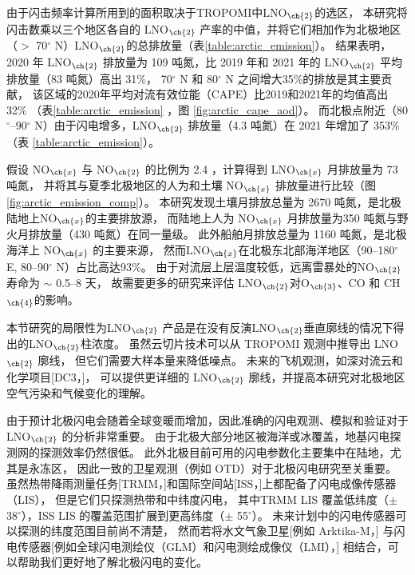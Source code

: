 由于闪击频率计算所用到的面积取决于TROPOMI中LNO$_{\ch{2}}$的选区，
本研究将闪击数乘以三个地区各自的 LNO$_{\ch{2}}$ 产率的中值，并将它们相加作为北极地区（$>$ 70$^{\circ}$ N）LNO$_{\ch{2}}$的总排放量（表\ref{table:arctic_emission}）。
结果表明，2020 年 LNO$_{\ch{2}}$ 排放量为 109 吨氮，比 2019 年和 2021 年的 LNO$_{\ch{2}}$ 平均排放量（83 吨氮）高出 31\%，
70$^{\circ}$ N 和 80$^{\circ}$ N 之间增大35\%的排放是其主要贡献，
该区域的2020年平均对流有效位能（CAPE）比2019和2021年的均值高出 32\%
（表\ref{table:arctic_emission} ，图 \ref{fig:arctic_cape_aod}）。
而北极点附近（80$^{\circ}$--90$^{\circ}$ N）由于闪电增多，LNO$_{\ch{2}}$ 排放量（4.3 吨氮）在 2021 年增加了 353\% （表 \ref{table:arctic_emission}）。

假设 NO$_{\ch{x}}$ 与 NO$_{\ch{2}}$ 的比例为 2.4 \citep{Silvern.2018}，计算得到 LNO$_{\ch{x}}$ 月排放量为 73 吨氮，
并将其与夏季北极地区的人为和土壤 NO$_{\ch{x}}$ 排放量进行比较（图\ref{fig:arctic_emission_comp}）。
本研究发现土壤月排放总量为 2670 吨氮，是北极陆地上NO$_{\ch{x}}$的主要排放源，
而陆地上人为 NO$_{\ch{x}}$ 月排放量为350 吨氮与野火月排放量（430 吨氮）在同一量级。
此外船舶月排放总量为 1160 吨氮，是北极海洋上 NO$_{\ch{x}}$ 的主要来源，
然而LNO$_{\ch{x}}$在北极东北部海洋地区（90--180$^{\circ}$ E, 80--90$^{\circ}$ N）占比高达93\%。
由于对流层上层温度较低，远离雷暴处的NO$_{\ch{2}}$寿命为 $\sim$ 0.5--8 天\citep{Schumann.2007,Nault.2017}，
故需要更多的研究来评估 LNO$_{\ch{2}}$对O$_{\ch{3}}$、CO 和 CH$_{\ch{4}}$的影响。


本节研究的局限性为LNO$_{\ch{2}}$ 产品是在没有反演LNO$_{\ch{2}}$垂直廓线的情况下得出的LNO$_{\ch{2}}$柱浓度。
虽然云切片技术\citep{BelmonteRivas.2015,Marais.2021}可以从 TROPOMI 观测中推导出 LNO$_{\ch{2}}$ 廓线，
但它们需要大样本量来降低噪点。
未来的飞机观测，如深对流云和化学项目[DC3，\citet{Barth.2019}]，
可以提供更详细的 LNO$_{\ch{2}}$ 廓线，并提高本研究对北极地区空气污染和气候变化的理解\citep{Law.2007,Schmale.2018}。

由于预计北极闪电会随着全球变暖而增加，因此准确的闪电观测、模拟和验证对于 LNO$_{\ch{2}}$ 的分析非常重要。
由于北极大部分地区被海洋或冰覆盖，地基闪电探测网的探测效率仍然很低\citep{Vagasky.2022}。
此外北极目前可用的闪电参数化主要集中在陆地，尤其是永冻区\citep{Chen.2021a}，
因此一致的卫星观测（例如 OTD）对于北极闪电研究至关重要。
虽然热带降雨测量任务[TRMM，\citet{Cecil.2014}]和国际空间站[ISS，\citet{Blakeslee.2020}]上都配备了闪电成像传感器（LIS），
但是它们只探测热带和中纬度闪电，
其中TRMM LIS 覆盖低纬度（$\pm$ 38$^{\circ}$），ISS LIS 的覆盖范围扩展到更高纬度（$\pm$ 55$^{\circ}$）。
未来计划中的闪电传感器可以探测的纬度范围目前尚不清楚，
然而若将水文气象卫星[例如 Arktika-M，\citet{Asmus.2021}]
与闪电传感器[例如全球闪电测绘仪（GLM）和闪电测绘成像仪（LMI），\citet{Goodman.2013,Yang.2017}] 相结合，可以帮助我们更好地了解北极闪电的变化。


